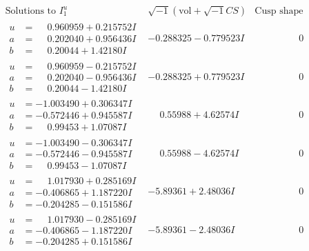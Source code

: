 \documentclass[1p]{elsarticle_modified}
\theoremstyle{definition}
\newcommand{\I}{\sqrt{-1}}
\begin{document}
$$\begin{array}{c|c|c}  
\text{Solutions to }I^u_{1}& \I (\text{vol} + \sqrt{-1}CS) & \text{Cusp shape}\\
 \hline 
\begin{aligned}
u &= \phantom{-}0.960959 + 0.215752 I \\
a &= \phantom{-}0.202040 + 0.956436 I \\
b &= \phantom{-}0.20044 + 1.42180 I\end{aligned}
 & -0.288325 - 0.779523 I & \phantom{-0.000000 } 0 \\ \hline\begin{aligned}
u &= \phantom{-}0.960959 - 0.215752 I \\
a &= \phantom{-}0.202040 - 0.956436 I \\
b &= \phantom{-}0.20044 - 1.42180 I\end{aligned}
 & -0.288325 + 0.779523 I & \phantom{-0.000000 } 0 \\ \hline\begin{aligned}
u &= -1.003490 + 0.306347 I \\
a &= -0.572446 + 0.945587 I \\
b &= \phantom{-}0.99453 + 1.07087 I\end{aligned}
 & \phantom{-}0.55988 + 4.62574 I & \phantom{-0.000000 } 0 \\ \hline\begin{aligned}
u &= -1.003490 - 0.306347 I \\
a &= -0.572446 - 0.945587 I \\
b &= \phantom{-}0.99453 - 1.07087 I\end{aligned}
 & \phantom{-}0.55988 - 4.62574 I & \phantom{-0.000000 } 0 \\ \hline\begin{aligned}
u &= \phantom{-}1.017930 + 0.285169 I \\
a &= -0.406865 + 1.187220 I \\
b &= -0.204285 - 0.151586 I\end{aligned}
 & -5.89361 + 2.48036 I & \phantom{-0.000000 } 0 \\ \hline\begin{aligned}
u &= \phantom{-}1.017930 - 0.285169 I \\
a &= -0.406865 - 1.187220 I \\
b &= -0.204285 + 0.151586 I\end{aligned}
 & -5.89361 - 2.48036 I & \phantom{-0.000000 } 0 \\ \hline\begin{aligned}

\end{aligned}
\end{array}$$
\end{document}

